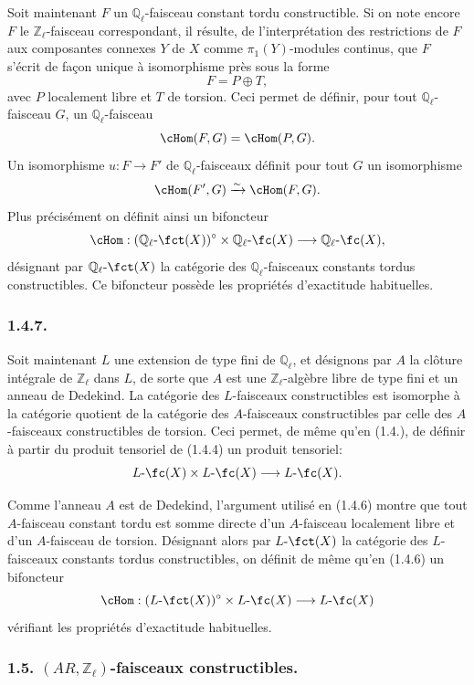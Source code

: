 Soit maintenant \(F\) un \(\mathbb{Q}_\ell\)-faisceau constant tordu constructible. Si on note encore \(F\) le \(\mathbb{Z}_\ell\)-faisceau correspondant, il résulte, de l'interprétation des restrictions de \(F\) aux composantes connexes \(Y\) de \(X\) comme \(\pi_1(Y)\)-modules continus, que \(F\) s'écrit de façon unique à isomorphisme près sous la forme
\[
F=P\oplus T,
\]
avec \(P\) localement libre et \(T\) de torsion. Ceci permet de définir, pour tout \(\mathbb{Q}_\ell\)-faisceau \(G\), un \(\mathbb{Q}_\ell\)-faisceau
\[
\cHom(F,G)=\cHom(P,G).
\]
Un isomorphisme \(u:F\to F'\) de \(\mathbb{Q}_\ell\)-faisceaux définit pour tout \(G\) un isomorphisme
\[
\cHom(F',G)\xrightarrow{\sim}\cHom(F,G).
\]
Plus précisément on définit ainsi un bifoncteur
\[
\cHom:(\mathbb{Q}_\ell\text{-}\fct(X))^\circ\times \mathbb{Q}_\ell\text{-}\fc(X)
\longrightarrow \mathbb{Q}_\ell\text{-}\fc(X),
\]
désignant par \(\mathbb{Q}_\ell\text{-}\fct(X)\) la catégorie des \(\mathbb{Q}_\ell\)-faisceaux constants tordus constructibles. Ce bifoncteur possède les propriétés d'exactitude habituelles.

\subsubsection*{1.4.7.}
Soit maintenant \(L\) une extension de type fini de \(\mathbb{Q}_\ell\), et désignons par \(A\) la clôture intégrale de \(\mathbb{Z}_\ell\) dans \(L\), de sorte que \(A\) est une \(\mathbb{Z}_\ell\)-algèbre libre de type fini et un anneau de Dedekind. La catégorie des \(L\)-faisceaux constructibles est isomorphe à la catégorie quotient de la catégorie des \(A\)-faisceaux constructibles par celle des \(A\)-faisceaux constructibles de torsion. Ceci permet, de même qu'en (1.4.), de définir à partir du produit tensoriel de (1.4.4) un produit tensoriel:
\[
L\text{-}\fc(X)\times L\text{-}\fc(X)\longrightarrow L\text{-}\fc(X).
\]

Comme l'anneau \(A\) est de Dedekind, l'argument utilisé en (1.4.6) montre que tout \(A\)-faisceau constant tordu est somme directe d'un \(A\)-faisceau localement libre et d'un \(A\)-faisceau de torsion. Désignant alors par \(L\text{-}\fct(X)\) la catégorie des \(L\)-faisceaux constants tordus constructibles, on définit de même qu'en (1.4.6) un bifoncteur
\[
\cHom:(L\text{-}\fct(X))^\circ\times L\text{-}\fc(X)
\longrightarrow L\text{-}\fc(X)
\]
vérifiant les propriétés d'exactitude habituelles.

\subsubsection*{1.5. \((AR,\mathbb{Z}_\ell)\)-faisceaux constructibles.}


